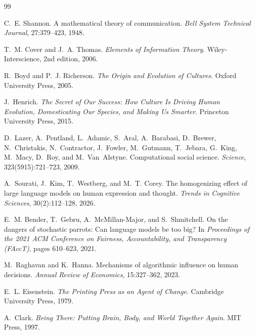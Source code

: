 \documentclass[12pt,a4paper]{article}
\theoremstyle{definition}
\theoremstyle{plain}
\theoremstyle{remark}
\begin{document}
\begin{thebibliography}{99}

C.~E. Shannon.
\newblock A mathematical theory of communication.
\newblock \emph{Bell System Technical Journal}, 27:379--423, 1948.

T.~M. Cover and J.~A. Thomas.
\newblock \emph{Elements of Information Theory}.
\newblock Wiley-Interscience, 2nd edition, 2006.

R.~Boyd and P.~J. Richerson.
\newblock \emph{The Origin and Evolution of Cultures}.
\newblock Oxford University Press, 2005.

J.~Henrich.
\newblock \emph{The Secret of Our Success: How Culture Is Driving Human Evolution,
Domesticating Our Species, and Making Us Smarter}.
\newblock Princeton University Press, 2015.

D.~Lazer, A.~Pentland, L.~Adamic, S.~Aral, A.~Barabasi, D.~Brewer,
N.~Christakis, N.~Contractor, J.~Fowler, M.~Gutmann, T.~Jebara, G.~King,
M.~Macy, D.~Roy, and M.~Van~Alstyne.
\newblock Computational social science.
\newblock \emph{Science}, 323(5915):721--723, 2009.

A.~Sourati, J.~Kim, T.~Westberg, and M.~T. Corey.
\newblock The homogenizing effect of large language models on human expression
and thought.
\newblock \emph{Trends in Cognitive Sciences}, 30(2):112--128, 2026.

E.~M. Bender, T.~Gebru, A.~McMillan-Major, and S.~Shmitchell.
\newblock On the dangers of stochastic parrots: Can language models be too big?
\newblock In \emph{Proceedings of the 2021 ACM Conference on Fairness,
Accountability, and Transparency (FAccT)}, pages 610--623, 2021.

M.~Raghavan and K.~Hanna.
\newblock Mechanisms of algorithmic influence on human decisions.
\newblock \emph{Annual Review of Economics}, 15:327--362, 2023.

E.~L. Eisenstein.
\newblock \emph{The Printing Press as an Agent of Change}.
\newblock Cambridge University Press, 1979.

A.~Clark.
\newblock \emph{Being There: Putting Brain, Body, and World Together Again}.
\newblock MIT Press, 1997.


\end{thebibliography}
\end{document}
